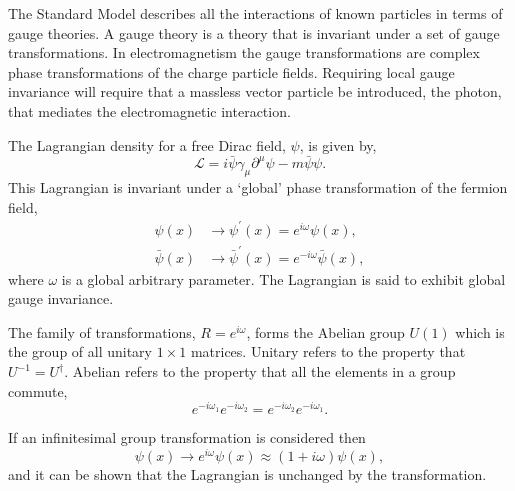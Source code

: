 The {Standard Model} describes all the interactions of known particles in terms
of gauge theories. A gauge theory is a theory that is invariant under a set of
gauge transformations.  In electromagnetism the gauge transformations are
complex phase transformations of the charge particle fields. Requiring local
gauge invariance will require that a massless vector particle be introduced, the
photon, that mediates the electromagnetic interaction.

The Lagrangian density for a free Dirac field, $\psi$, is given by,
\begin{equation}
\mathcal{L} = i \bar{\psi} \gamma_{\mu} \partial^{\mu} \psi - m \bar{\psi}\psi .
\end{equation}
This Lagrangian is invariant under a `global' phase transformation of the
fermion field,
\begin{align}
\psi(x)       &\to \psi^{\prime}(x) = e^{i\omega} \psi(x), \label{eq:global} \\
\bar{\psi}(x) &\to \bar{\psi}^{\prime}(x) = e^{-i\omega}\bar{\psi}(x),
\end{align}
where $\omega$ is a global arbitrary parameter. 
The Lagrangian is said to exhibit global gauge invariance. 

The family of transformations, $R = e^{i \omega}$, forms the
Abelian group $U(1)$ which is the group of all unitary $1\times 1$ matrices.
Unitary refers to the property that $U^{-1} = {U}^{\dagger}$.
Abelian refers to the property that all the elements in a
group commute, 
\begin{equation}
e^{-i\omega_1} 
e^{-i\omega_2} 
=
e^{-i\omega_2} 
e^{-i\omega_1} .
\end{equation}

If an infinitesimal group transformation is considered then 
\begin{equation}
\psi(x) 
\to e^{i\omega} \psi(x)
\approx (1+i\omega)\psi(x),
\end{equation}
and it can be shown that the Lagrangian is unchanged by the
transformation\cite{halzen1984quarks}.

